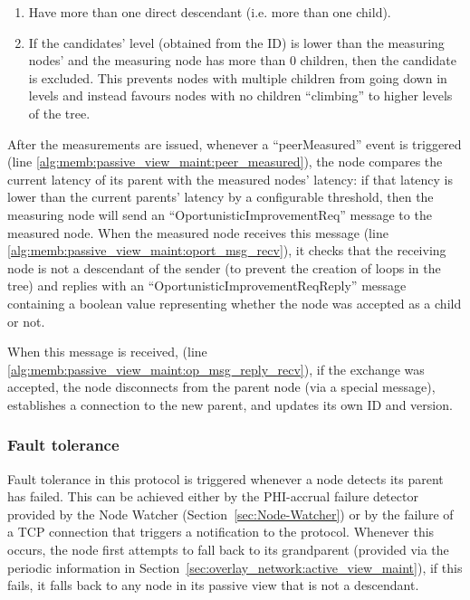 \begin{enumerate}
    \item Have more than one direct descendant (i.e. more than one child). 
    
    \item If the candidates' level (obtained from the ID) is lower than the measuring nodes' and the measuring node has more than 0 children, then the candidate is excluded. This prevents nodes with multiple children from going down in levels and instead favours nodes with no children ``climbing'' to higher levels of the tree.
\end{enumerate}

After the measurements are issued, whenever a ``peerMeasured'' event is triggered (line \ref{alg:memb:passive_view_maint:peer_measured}), the node compares the current latency of its parent with the measured nodes' latency: if that latency is lower than the current parents' latency by a configurable threshold, then the measuring node will send an ``OportunisticImprovementReq'' message to the measured node. When the measured node receives this message (line \ref{alg:memb:passive_view_maint:oport_msg_recv}), it checks that the receiving node is not a descendant of the sender (to prevent the creation of loops in the tree) and replies with an ``OportunisticImprovementReqReply'' message containing a boolean value representing whether the node was accepted as a child or not.

When this message is received, (line \ref{alg:memb:passive_view_maint:op_msg_reply_recv}), if the exchange was accepted, the node disconnects from the parent node (via a special message), establishes a connection to the new parent, and updates its own ID and version.

\subsubsection{Fault tolerance}

Fault tolerance in this protocol is triggered whenever a node detects its parent has failed. This can be achieved either by the PHI-accrual failure detector provided by the Node Watcher (Section~\ref{sec:Node-Watcher}) or by the failure of a TCP connection that triggers a notification to the protocol. Whenever this occurs, the node first attempts to fall back to its grandparent (provided via the periodic information in Section~\ref{sec:overlay_network:active_view_maint}), if this fails, it falls back to any node in its passive view that is not a descendant.


